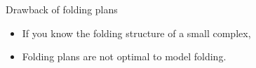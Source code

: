 \begin{frame}{Drawback of folding plans}
    \begin{itemize}
        \item<7->[$\Rightarrow$]If you know the folding structure of a small complex,
        \item<9->[$\leadsto$]Folding plans are not optimal to model folding.
    \end{itemize}
\end{frame}




